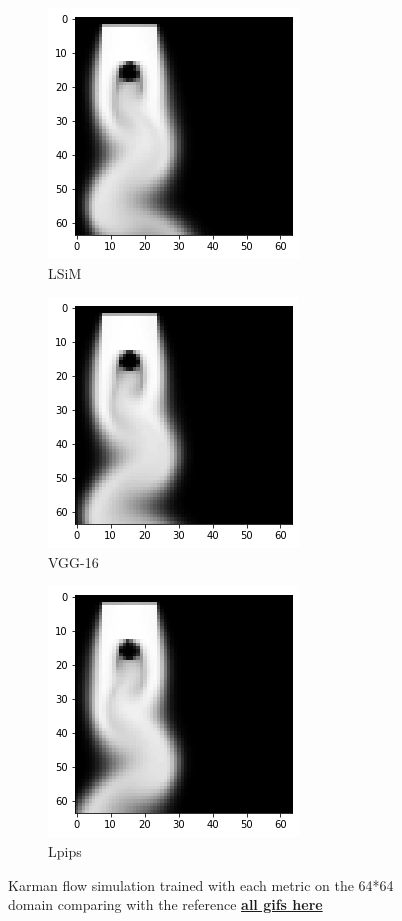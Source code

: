 \documentclass[a4paper,12pt,twoside]{report}
\begin{document}
\begin{figure}
	\begin{subfigure}{0.32\textwidth}
		\centering
		\includegraphics[scale=0.5]{karman_low/lsim}
		\caption{LSiM}
	\end{subfigure}
	\begin{subfigure}{0.32\textwidth}
		\centering
		\includegraphics[scale=0.5]{karman_low/vgg}
		\caption{VGG-16}
	\end{subfigure}
	\begin{subfigure}{0.32\textwidth}
		\centering
		\includegraphics[scale=0.5]{karman_low/lpips}
		\caption{Lpips}
	\end{subfigure}
	\caption{Karman flow simulation trained with each metric on the 64*64 domain comparing with the reference \href{https://github.com/w191444052/sol-data/tree/master/karman_low}{\bf{all gifs here}}}
	\label{sol karman low}
\end{figure}
\end{document}
